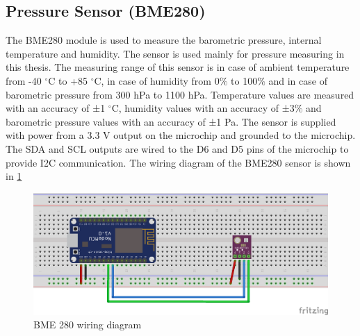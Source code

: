 \begin{itemize}

\end{itemize}


\subsection{Pressure Sensor (BME280)}

The BME280 \citep{BME280_Datasheet} module is used to measure the barometric pressure, internal temperature and humidity. The sensor is used mainly for pressure measuring in this thesis. The measuring range of this sensor is in case of ambient temperature from -40 $^{\circ}$C to +85 $^{\circ}$C, in case of humidity from 0$\%$ to 100$\%$ and in case of barometric pressure from 300 hPa to 1100 hPa. Temperature values are measured with an accuracy of ±1 $^{\circ}$C, humidity values with an accuracy of ±3$\%$ and barometric pressure values with an accuracy of ±1 Pa. The sensor is supplied with power from a 3.3 V output on the microchip and grounded to the microchip. The SDA and SCL outputs are wired to the D6 and D5 pins of the microchip to provide I2C communication. The wiring diagram of the BME280 sensor is shown in \cref{fig:bme280_schema}

\begin{figure}[H]
	\centering
	\includegraphics[width=\textwidth]{img/bme280_schema.png}
	\caption{BME 280 wiring diagram}
	\label{fig:bme280_schema}
\end{figure}


